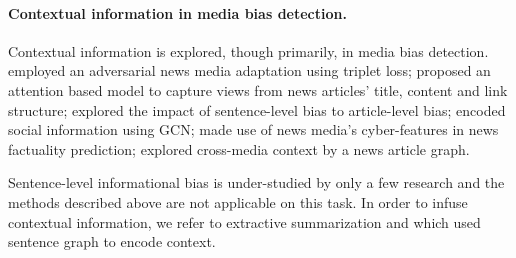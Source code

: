 \paragraph{Contextual information in media bias detection.} 
Contextual information is explored, though primarily, in media bias detection. \citet{baly2020detect} employed an adversarial news media adaptation using triplet loss; \citet{kulkarni-etal-2018-multi} proposed an attention based model to capture views from news articles' title, content and link structure; \citet{chen-etal-2020-detecting} explored the impact of sentence-level bias to article-level bias; \citet{li-goldwasser-2019-encoding} encoded social information using GCN; \citet{baly-etal-2018-predicting} made use of news media's cyber-features in news factuality prediction; \citet{10.1145/3366423.3380158} explored cross-media context by a news article graph.

Sentence-level informational bias is under-studied by only a few research and the methods described above are not applicable on this task. In order to infuse contextual information, we refer to extractive summarization \citet{10.1145/3397271.3401327} and \citet{christensen-etal-2013-towards} which used sentence graph to encode context.

